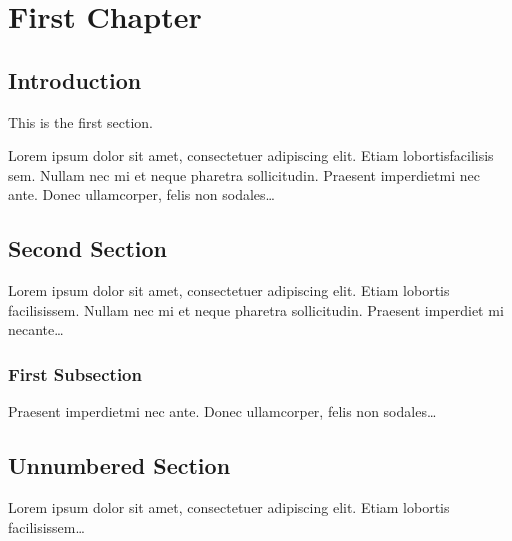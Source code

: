\documentclass{book}
\begin{document}
\chapter{First Chapter}

\section{Introduction}

This is the first section.

Lorem  ipsum  dolor  sit  amet,  consectetuer  adipiscing  
elit. Etiam  lobortisfacilisis sem.  Nullam nec mi et 
neque pharetra sollicitudin.  Praesent imperdietmi nec ante. 
Donec ullamcorper, felis non sodales\ldots

\section{Second Section}

Lorem ipsum dolor sit amet, consectetuer adipiscing elit.  
Etiam lobortis facilisissem.  Nullam nec mi et neque pharetra 
sollicitudin.  Praesent imperdiet mi necante\ldots

\subsection{First Subsection}
Praesent imperdietmi nec ante. Donec ullamcorper, felis non sodales\ldots

\section*{Unnumbered Section}
Lorem ipsum dolor sit amet, consectetuer adipiscing elit.  
Etiam lobortis facilisissem\ldots
\end{document}
